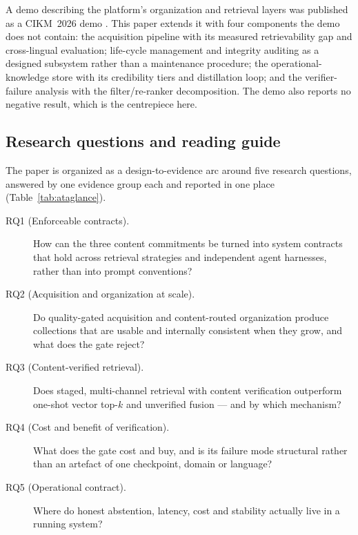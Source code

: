 A demo describing the platform's organization and retrieval layers was
published as a CIKM~2026 demo \cite{hmrs-demo}. This paper extends it with
four components the demo does not contain: the acquisition pipeline with its
measured retrievability gap and cross-lingual evaluation; life-cycle
management and integrity auditing as a designed subsystem rather than a
maintenance procedure; the operational-knowledge store with its credibility
tiers and distillation loop; and the verifier-failure analysis with the
filter/re-ranker decomposition. The demo also reports no negative result, which
is the centrepiece here.

\subsection{Research questions and reading guide}
\label{sec:rq}

The paper is organized as a design-to-evidence arc around five research
questions, answered by one evidence group each and reported in one place
(Table~\ref{tab:ataglance}).

\begin{description}
\item[RQ1 (Enforceable contracts).] How can the three content commitments be
turned into system contracts that hold across retrieval strategies and
independent agent harnesses, rather than into prompt conventions?
\item[RQ2 (Acquisition and organization at scale).] Do quality-gated
acquisition and content-routed organization produce collections that are
usable and internally consistent when they grow, and what does the gate
reject?
\item[RQ3 (Content-verified retrieval).] Does staged, multi-channel retrieval
with content verification outperform one-shot vector top-$k$ and unverified
fusion --- and by which mechanism?
\item[RQ4 (Cost and benefit of verification).] What does the gate cost and
buy, and is its failure mode structural rather than an artefact of one
checkpoint, domain or language?
\item[RQ5 (Operational contract).] Where do honest abstention, latency, cost
and stability actually live in a running system?
\end{description}

